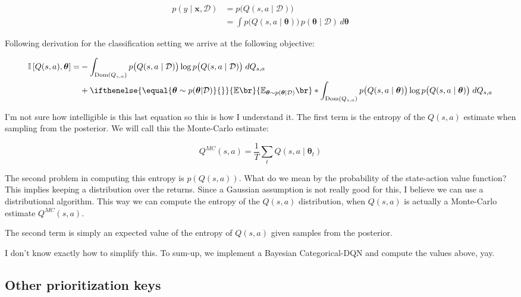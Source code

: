\documentclass[10pt,a4paper]{article} %
\newcommand{\btheta}{\bm{\theta}}
\newcommand{\data}{\ensuremath{\mathcal{D}}}
\newcommand{\Expected}[1][]{
   \ifthenelse{\equal{#1}{}}{\mathbb{E}\br}{\mathbb{E}_{#1}\br}%
}
\begin{document}
\begin{align*}
   p(y \mid \bm{x}, \data)
      & = p \big( Q(s, a \mid \data) \big) \\
      & = \int p\big( Q(s, a \mid \btheta) \big) \, p(\btheta \mid \data) \, d\btheta
\end{align*}

Following \cite{Gal2017DeepBA} derivation for the classification setting we 
arrive at the following objective:

\begin{equation}
\begin{split}
   \mathbb{I}\left[ Q(s,a), \btheta \right] = 
      & - \int_{\text{Dom}(Q_{s,a})} p \big( Q(s, a \mid \data) \big) 
         \log p \big( Q(s, a \mid \data) \big) \;dQ_{s,a}\\
      & + \Expected[\btheta \sim p(\btheta | \data)]*{
            \int_{\text{Dom}(Q_{s,a})} p \big( Q(s, a \mid \btheta) \big) 
            \log p \big( Q(s, a \mid \btheta) \big) \;dQ_{s,a}}
\end{split}
\end{equation}

I'm not sure how intelligible is this last equation so this is how I understand
it. The first term is the entropy of the $Q(s,a)$ estimate when sampling from 
the posterior. We will call this the Monte-Carlo estimate: 

\begin{equation}
   Q^{MC}(s,a) = \frac{1}{T} \sum_{t}{Q(s, a \mid \btheta_t)}
   \label{eq:Q-mc}
\end{equation}

The second problem in computing this entropy is $p(Q(s,a))$. What do we mean
by the probability of the state-action value function? This implies keeping a
distribution over the returns. Since a Gaussian assumption is not really
good for this, I believe we can use a distributional algorithm. This way we 
can compute the entropy of the $Q(s,a)$ distribution, when $Q(s,a)$ is actually
a Monte-Carlo estimate $Q^{MC}(s,a)$.

The second term is simply an expected value of the entropy of $Q(s,a)$ given
samples from the posterior.

\bigskip
I don't know exactly how to simplify this. To sum-up, we implement a Bayesian
Categorical-DQN and compute the values above, yay.



\subsection{Other prioritization keys}
\end{document}
